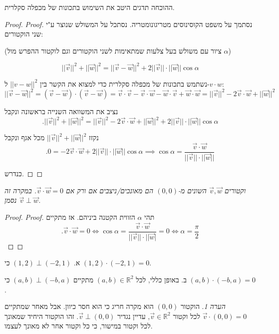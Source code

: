 \documentclass[
  hebrew,
  12pt,
  a4paper,
  oneside]{book}
\theoremstyle{definition}
\theoremstyle{remark}
\theoremstyle{plain}
\theoremstyle{remark}
\newtheorem*{remark}{הערה}
\begin{document}
ההוכחה תדגים היטב את השימוש בתכונות של מכפלה סקלרית.

\begin{proof}
\emph{Proof.} נסתמך על משפט הקוסינוסים מטריגונומטריה. נסתכל על המשולש
שנוצר ע"י שני הוקטורים:

(ציור עם משולש בעל צלעות שמתאימות לשני הוקטורים וגם לוקטור ההפרש מול
\(\alpha\))

\[||\vec{v}||^{2}+||\vec{w}||^{2}=||\vec{v}-\vec{w}||^{2}+2||\vec{v}||\cdot||\vec{w}||\cos\alpha\]

נשתמש בתכונות של מכפלה סקלרית כדי למצוא את הקשר בין \(||v-w||^{2}\)
ל-\(v\cdot w\):
\[||\vec{v}-\vec{w}||^{2}=(\vec{v}-\vec{w})\cdot(\vec{v}-\vec{w})=\vec{v}\cdot\vec{v}-\vec{v}\cdot\vec{w}-\vec{w}\cdot\vec{v}+\vec{w}\cdot\vec{w}=||\vec{v}||^{2}-2\vec{v}\cdot\vec{w}+||\vec{w}||^{2}\]

נציב את המשוואה השנייה בראשונה ונקבל
\[.||\vec{v}||^{2}+||\vec{w}||^{2}=||\vec{v}||^{2}-2\vec{v}\cdot\vec{w}+||\vec{w}||^{2}+2||\vec{v}||\cdot||\vec{w}||\cos\alpha\]

נקזז \(||\vec{v}||^{2}+||\vec{w}||^{2}\) מכל אגף ונקבל
\[.0=-2\vec{v}\cdot\vec{w}+2||\vec{v}||\cdot||\vec{w}||\cos\alpha\implies\cos\alpha=\frac{\vec{v}\cdot\vec{w}}{||\vec{v}||\cdot||\vec{w}||}\]

כנדרש.~◻
\end{proof}

\begin{corollary}

\emph{וקטורים \(\vec{v},\vec{w}\) השונים מ-\((0,0)\) הם מאונכים/ניצבים
אם ורק אם \(\vec{v}\cdot\vec{w}=0\). במקרה זה נסמן
\(\vec{v}\perp\vec{w}\).}

\end{corollary}

\begin{proof}
\emph{Proof.} תהי \(\alpha\) הזווית הקטנה ביניהם. אז מתקיים
\[.\vec{v}\cdot\vec{w}=0\iff\cos\alpha=\frac{\vec{v}\cdot\vec{w}}{||\vec{v}||\cdot||\vec{w}|}=0\iff\alpha=\frac{\pi}{2}\]~◻
\end{proof}

\begin{example}

א. \((1,2)\perp(-2,1)\) כי \((1,2)\cdot(-2,1)=0\).

ב. באופן כללי, לכל \((a,b)\in\mathbb{R}^{2}\) מתקיים
\((a,b)\perp(-b,a)\) כי \((a,b)\cdot(-b,a)=0\).

\end{example}

\begin{remark}
הוקטור \((0,0)\) הוא מקרה חריג כי הוא חסר כיוון. אבל מאחר שמתקיים
\(\vec{v}\cdot(0,0)=0\) לכל וקטור \(\vec{v}\in\mathbb{R}^2\), עדיין
נגדיר \(\vec{v}\perp(0,0)\). זהו הוקטור היחיד שמאונך לכל וקטור במישור,
כי כל וקטור אחר לא מאונך לעצמו.
\end{remark}
\end{document}
